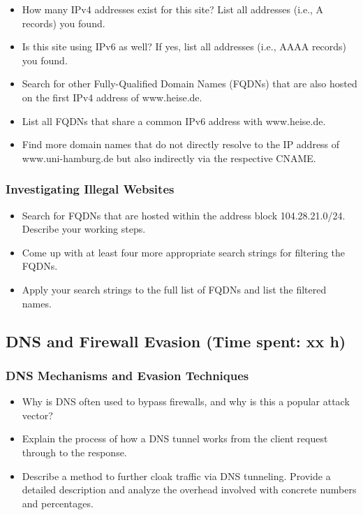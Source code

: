 \documentclass[11pt]{article}
\providecommand{\tightlist}{%
      \setlength{\itemsep}{0pt}\setlength{\parskip}{0pt}}
\begin{document}
\begin{itemize}
\tightlist
\item
  How many IPv4 addresses exist for this site? List all addresses (i.e.,
  A records) you found.
\item
  Is this site using IPv6 as well? If yes, list all addresses (i.e.,
  AAAA records) you found.
\item
  Search for other Fully-Qualified Domain Names (FQDNs) that are also
  hosted on the first IPv4 address of www.heise.de.
\item
  List all FQDNs that share a common IPv6 address with www.heise.de.
\item
  Find more domain names that do not directly resolve to the IP address
  of www.uni-hamburg.de but also indirectly via the respective CNAME.
\end{itemize}

\hypertarget{investigating-illegal-websites}{%
\subsubsection{Investigating Illegal
Websites}\label{investigating-illegal-websites}}

\begin{itemize}
\tightlist
\item
  Search for FQDNs that are hosted within the address block
  104.28.21.0/24. Describe your working steps.
\item
  Come up with at least four more appropriate search strings for
  filtering the FQDNs.
\item
  Apply your search strings to the full list of FQDNs and list the
  filtered names.
\end{itemize}

\hypertarget{dns-and-firewall-evasion-time-spent-xx-h}{%
\subsection{DNS and Firewall Evasion (Time spent: xx
h)}\label{dns-and-firewall-evasion-time-spent-xx-h}}

\hypertarget{dns-mechanisms-and-evasion-techniques}{%
\subsubsection{DNS Mechanisms and Evasion
Techniques}\label{dns-mechanisms-and-evasion-techniques}}

\begin{itemize}
\tightlist
\item
  Why is DNS often used to bypass firewalls, and why is this a popular
  attack vector?
\item
  Explain the process of how a DNS tunnel works from the client request
  through to the response.
\item
  Describe a method to further cloak traffic via DNS tunneling. Provide
  a detailed description and analyze the overhead involved with concrete
  numbers and percentages.
\end{itemize}
\end{document}

